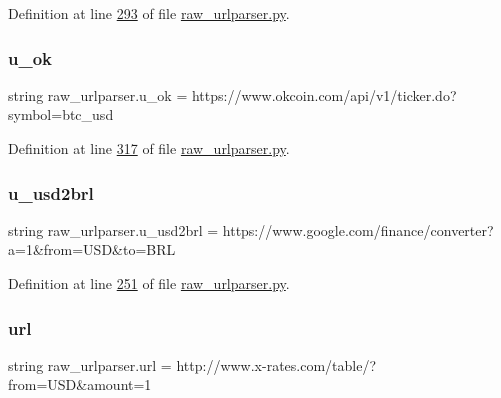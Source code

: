 Definition at line \hyperlink{raw__urlparser_8py_source_l00293}{293} of file \hyperlink{raw__urlparser_8py_source}{raw\+\_\+urlparser.\+py}.

\mbox{\label{namespaceraw__urlparser_a22c1a17803a88426d38d70ad6d4290d2}} 
\subsubsection{\texorpdfstring{u\+\_\+ok}{u\_ok}}
{\footnotesize\ttfamily string raw\+\_\+urlparser.\+u\+\_\+ok = \textquotesingle{}https\+://www.\+okcoin.\+com/api/v1/ticker.\+do?symbol=btc\+\_\+usd\textquotesingle{}}



Definition at line \hyperlink{raw__urlparser_8py_source_l00317}{317} of file \hyperlink{raw__urlparser_8py_source}{raw\+\_\+urlparser.\+py}.

\mbox{\label{namespaceraw__urlparser_a63e1f0abe7b1f43c4891ce9aec98261d}} 
\subsubsection{\texorpdfstring{u\+\_\+usd2brl}{u\_usd2brl}}
{\footnotesize\ttfamily string raw\+\_\+urlparser.\+u\+\_\+usd2brl = \textquotesingle{}https\+://www.\+google.\+com/finance/converter?a=1\&from=U\+SD\&to=B\+RL\textquotesingle{}}



Definition at line \hyperlink{raw__urlparser_8py_source_l00251}{251} of file \hyperlink{raw__urlparser_8py_source}{raw\+\_\+urlparser.\+py}.

\mbox{\label{namespaceraw__urlparser_a9242b893f4f49ef7cc0d4e599b70daa4}} 
\subsubsection{\texorpdfstring{url}{url}}
{\footnotesize\ttfamily string raw\+\_\+urlparser.\+url = \textquotesingle{}http\+://www.\+x-\/rates.\+com/table/?from=U\+SD\&amount=1\textquotesingle{}}



